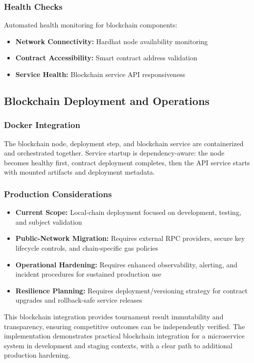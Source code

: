 \documentclass[11pt,a4paper]{report}
\begin{document}
\subsubsection{Health Checks}
Automated health monitoring for blockchain components:
\begin{itemize}
  \item \textbf{Network Connectivity:} Hardhat node availability monitoring
  \item \textbf{Contract Accessibility:} Smart contract address validation
  \item \textbf{Service Health:} Blockchain service API responsiveness
\end{itemize}

\subsection{Blockchain Deployment and Operations}

\subsubsection{Docker Integration}
The blockchain node, deployment step, and blockchain service are containerized and orchestrated together. Service startup is dependency-aware: the node becomes healthy first, contract deployment completes, then the API service starts with mounted artifacts and deployment metadata.

\subsubsection{Production Considerations}
\begin{itemize}
  \item \textbf{Current Scope:} Local-chain deployment focused on development, testing, and subject validation
  \item \textbf{Public-Network Migration:} Requires external RPC providers, secure key lifecycle controls, and chain-specific gas policies
  \item \textbf{Operational Hardening:} Requires enhanced observability, alerting, and incident procedures for sustained production use
  \item \textbf{Resilience Planning:} Requires deployment/versioning strategy for contract upgrades and rollback-safe service releases
\end{itemize}

This blockchain integration provides tournament result immutability and transparency, ensuring competitive outcomes can be independently verified. The implementation demonstrates practical blockchain integration for a microservice system in development and staging contexts, with a clear path to additional production hardening.
\end{document}
